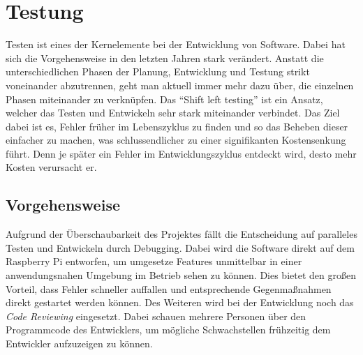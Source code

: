 
\chapter{Testung}
\begin{comment}
- Software testing during the software development
- Shift left testing
- quality assurance 
- detect defect as early as possible
- automatic testing
- goal of basic testing:
  - detect the obvious bugs that jump out immediately
  - otherwise: you get an expensive and unnexessary cycle of having to describe the problem of the devleoper,
  - who then has to repoduce it, debug it, solve it before trying again
- Basic steps for testing
- basic functionality testing
  - basic functions
- Code review
  - another pair of eyes
- static code analysis
  - anaylsis of your code through programs
  - coding standards
- unit testing
  - continous integration environment, unit should run on every commit
  - coverage goals
\end{comment}


Testen ist eines der Kernelemente bei der Entwicklung von Software. Dabei hat
sich die Vorgehensweise in den letzten Jahren stark verändert. Anstatt die
unterschiedlichen Phasen der Planung, Entwicklung und Testung strikt
voneinander abzutrennen, geht man aktuell immer mehr dazu über, die einzelnen
Phasen miteinander zu verknüpfen. \newline
Das \enquote{Shift left testing} ist ein Ansatz, welcher das Testen und
Entwickeln sehr stark miteinander verbindet. Das Ziel dabei ist es, Fehler
früher im Lebenszyklus zu finden und so das Beheben dieser einfacher zu
machen, was schlussendlicher zu einer signifikanten Kostensenkung führt. Denn
je später ein Fehler im Entwicklungszyklus entdeckt wird, desto mehr Kosten
verursacht er. \hfill \break


\section{Vorgehensweise}
Aufgrund der Überschaubarkeit des Projektes fällt die Entscheidung auf
paralleles Testen und Entwickeln durch Debugging. Dabei wird die Software
direkt auf dem Raspberry Pi entworfen, um umgesetze Features unmittelbar in
einer anwendungsnahen Umgebung im Betrieb sehen zu können. Dies bietet den
großen Vorteil, dass Fehler schneller auffallen und entsprechende
Gegenmaßnahmen direkt gestartet werden können. \newline
Des Weiteren wird bei der Entwicklung noch das \textit{Code Reviewing}
eingesetzt. Dabei schauen mehrere Personen über den Programmcode des
Entwicklers, um mögliche Schwachstellen frühzeitig dem Entwickler aufzuzeigen
zu können. 

